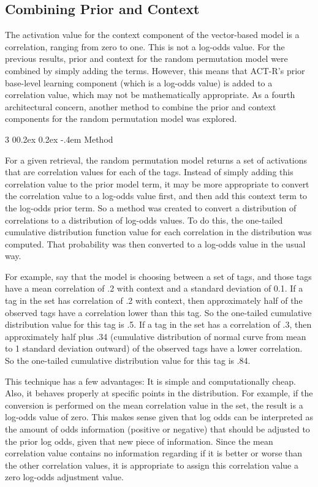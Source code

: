 \documentclass[man,floatsintext,donotrepeattitle]{apa6}
\makeatletter
\renewcommand{\subsubsection}{%
  \@startsection
  {subsubsection}%
  {3}%
  {\parindent}%
  {0\baselineskip \@plus 0.2ex \@minus 0.2ex}%
  {-.4em}%
  {\normalfont\normalsize\bfseries\addperi}}
\makeatother
\begin{document}
\subsection{Combining Prior and Context}

The activation value for the context component of the vector-based model is a correlation, ranging from zero to one.
This is not a log-odds value.
For the previous results, prior and context for the random permutation model were combined by simply adding the terms.
However, this means that ACT-R's prior base-level learning component (which is a log-odds value) is added to a correlation value, which may not be mathematically appropriate.
As a fourth architectural concern, another method to combine the prior and context components for the random permutation model was explored.

\subsubsection{Method}

For a given retrieval, the random permutation model returns a set of activations that are correlation values for each of the tags.
Instead of simply adding this correlation value to the prior model term, it may be more appropriate to convert the correlation value to a log-odds value first, and then add this context term to the log-odds prior term.
So a method was created to convert a distribution of correlations to a distribution of log-odds values.
To do this, the one-tailed cumulative distribution function value for each correlation in the distribution was computed.
That probability was then converted to a log-odds value in the usual way. 

For example, say that the model is choosing between a set of tags, and those tags have a mean correlation of .2 with context and a standard deviation of 0.1.
If a tag in the set has correlation of .2 with context, then approximately half of the observed tags have a correlation lower than this tag.
So the one-tailed cumulative distribution value for this tag is .5.
If a tag in the set has a correlation of .3, then approximately half plus .34 (cumulative distribution of normal curve from mean to 1 standard deviation outward) of the observed tags have a lower correlation.
So the one-tailed cumulative distribution value for this tag is .84.

This technique has a few advantages: 
It is simple and computationally cheap.
Also, it behaves properly at specific points in the distribution.
For example, if the conversion is performed on the mean correlation value in the set, the result is a log-odds value of zero.
This makes sense given that log odds can be interpreted as the amount of odds information (positive or negative) that should be adjusted to the prior log odds, given that new piece of information.
Since the mean correlation value contains no information regarding if it is better or worse than the other correlation values, it is appropriate to assign this correlation value a zero log-odds adjustment value.
\end{document}
